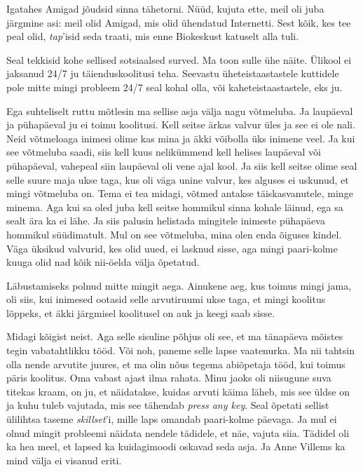 Igatahes Amigad jõudsid sinna tähetorni. Nüüd, kujuta ette, 
meil oli juba järgmine asi: meil olid Amigad,  mis olid ühendatud  Internetti. 
Sest kõik, kes  tee peal olid, \emph{tap}'isid seda traati, mis enne Biokeskust katuselt 
alla tuli. 


Seal tekkisid kohe sellised sotsiaalsed surved. Ma toon sulle ühe näite. 
Ülikool ei jaksanud 24/7 ju  täienduskoolitusi teha. Seevastu 
üheteistaastastele kuttidele pole mitte mingi probleem 24/7 seal kohal olla, või 
kaheteistaastastele, eks ju. 

Ega suhteliselt ruttu mõtlesin ma sellise asja välja nagu võtmeluba. Ja 
laupäeval ja pühapäeval ju ei toimu koolitusi. Kell seitse ärkas 
valvur üles ja see ei ole nali. Neid võtmeloaga inimesi olime kas mina ja äkki 
võibolla üks inimene veel. Ja kui see võtmeluba saadi, siis kell kuus 
nelikümmend  kell helises laupäeval või pühapäeval, vahepeal siin laupäeval oli 
vene ajal kool. Ja siis kell seitse olime seal selle suure maja ukse taga, kus 
oli väga unine valvur, kes alguses ei uskunud, et mingi võtmeluba on.  
Tema ei tea midagi, võtmed antakse täiskasvanutele, minge minema. Aga kui 
sa oled juba kell seitse hommikul sinna kohale läinud, ega sa sealt ära ka ei 
lähe. Ja siis palusin helistada mingitele inimeste pühapäeva hommikul 
süüdimatult. Mul on see võtmeluba, mina olen enda õiguses kindel. Väga 
üksikud valvurid, kes olid uued, ei lasknud sisse, aga mingi paari-kolme kuuga 
olid nad kõik nii-öelda välja õpetatud.


Läbustamiseks polnud mitte mingit aega. Ainukene aeg, kus toimus mingi jama, 
oli siis, kui inimesed ootasid selle arvutiruumi ukse taga, et mingi koolitus 
lõppeks, et äkki järgmisel koolitusel on auk ja keegi saab sisse. 


Midagi kõigist neist. Aga selle sisuline põhjus oli see, et ma tänapäeva 
mõistes tegin vabatahtlikku tööd. Või noh, paneme selle  lapse vaatenurka. Ma 
nii tahtsin olla nende arvutite juures, et ma olin nõus tegema abiõpetaja tööd, 
kui toimus päris koolitus. Oma vabast ajast ilma rahata. 
Minu jaoks oli niisugune suva titekas kraam, on ju, et  
näidatakse, kuidas  arvuti käima läheb, mis see üldse on ja kuhu tuleb 
vajutada, mis see tähendab \emph{press any key}. Seal õpetati sellist  
ülilihtsa taseme \emph{skillset}'i, mille laps omandab paari-kolme 
päevaga. Ja mul ei olnud mingit probleemi näidata nendele tädidele, et näe, 
vajuta siia. Tädidel oli ka hea meel, et lapsed ka kuidagimoodi  oskavad seda 
asja. Ja Anne Villems ka mind välja ei visanud eriti. 

